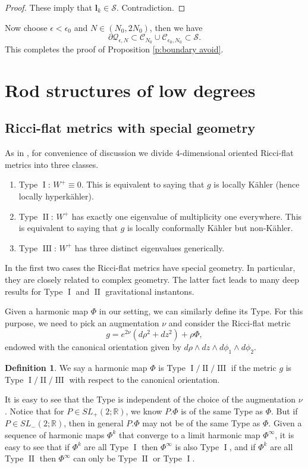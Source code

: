 \documentclass[a4paper,11pt]{amsart}
\theoremstyle{definition}
\newtheorem{definition}[theorem]{Definition}
\numberwithin{equation}{section}
\newcommand{\bl}{\bm{l}}
\DeclareMathOperator{\I}{I}
\DeclareMathOperator{\II}{II}
\DeclareMathOperator{\III}{III}
\begin{document}
\begin{proof}
    These imply that $\bl_k\in \mathcal S$. Contradiction.
\end{proof}

Now choose $\epsilon<\epsilon_0$ and $N\in (N_0, 2N_0)$, then we have  $$\partial\mathcal{Q}_{\epsilon,N}\subset \mathcal{C}_{N_0}\cup \mathcal{C}_{\epsilon_0, N_0}\subset \mathcal S.$$ This completes the proof of Proposition \ref{p:boundary avoid}.



\section{Rod structures of low degrees}\label{sec:degree 0 and 1}
\subsection{Ricci-flat metrics with special geometry}\label{sec:7.1}

As in \cite{Li1,Li2}, for convenience of discussion we divide 4-dimensional oriented Ricci-flat metrics into three classes.

\begin{enumerate}
	\item Type $\I$: $W^+\equiv0$. This is equivalent to saying that $g$ is locally K\"ahler (hence locally hyperk\"ahler). 
	\item Type $\II$: $W^+$ has exactly one eigenvalue of multiplicity one everywhere. This is equivalent to saying that $g$ is locally conformally K\"ahler but non-K\"ahler.  
	\item Type $\III$: $W^+$ has three distinct eigenvalues generically.
\end{enumerate}
In the first two cases the Ricci-flat metrics have special geometry. In particular, they are closely related to complex geometry. The latter fact leads to many deep results for Type $\I$ and $\II$ gravitational instantons.


Given a harmonic map $\Phi$ in our setting, we can similarly define its Type. For this purpose, we need to pick an augmentation $\nu$ and consider  the Ricci-flat metric $$g=e^{2\nu}(d\rho^2+dz^2)+\rho\Phi,$$ endowed  with the canonical orientation  given by $d\rho\wedge dz\wedge d\phi_1\wedge d\phi_2$. 



\begin{definition}\label{def:Type IIIIII}
    We say a harmonic map $\Phi$ is Type $\I/\II/\III$ if the metric $g$ is Type $\I/\II/\III$ with respect to the canonical orientation. 
\end{definition}
It is easy to see that the Type is independent of the choice of the augmentation $\nu$.
Notice that for $P\in SL_+(2;\mathbb R)$, we know $P. \Phi$ is of the same Type as $\Phi$. But if $P\in SL_-(2;\mathbb R)$, then in general $P. \Phi$ may not be of the same Type as $\Phi$. Given a sequence of harmonic maps $\Phi^k$ that converge to a limit harmonic map $\Phi^\infty$, it is easy to see that if $\Phi^k$ are all Type $\I$ then $\Phi^\infty$ is also Type $\I$, and if $\Phi^k$ are all Type $\II$ then $\Phi^\infty$ can only be Type $\II$ or Type $\I$.
\end{document}
